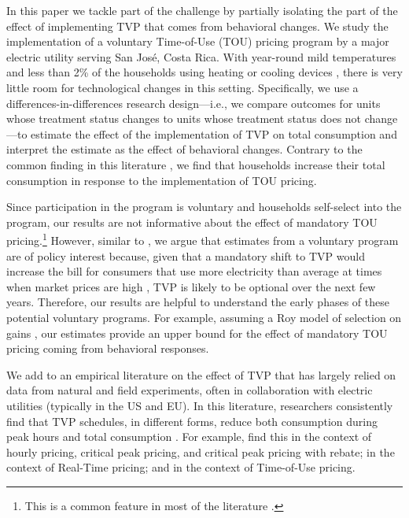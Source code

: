 \documentclass[12pt]{article}
\begin{document}
In this paper we tackle part of the challenge by partially isolating the part of the effect of implementing TVP that comes from behavioral changes. We study the implementation of a voluntary Time-of-Use (TOU) pricing program by a major electric utility serving San José, Costa Rica. With year-round mild temperatures and less than 2\% of the households using heating or cooling devices \citep{ministeriodeambienteyenergiaEstudioParaCaracterizacion2019}, there is very little room for technological changes in this setting. Specifically, we use a differences-in-differences research design---i.e., we compare outcomes for units whose treatment status changes to units whose treatment status does not change---to estimate the effect of the implementation of TVP on total consumption and interpret the estimate as the effect of behavioral changes. Contrary to the common finding in this literature \cite{faruquiHouseholdResponseDynamic2010,minabadtke-berkowPrimerTimevariantElectricity2015}, we find that households increase their total consumption in response to the implementation of TOU pricing.

Since participation in the program is voluntary and households self-select into the program, our results are not informative about the effect of mandatory TOU pricing.\footnote{This is a common feature in most of the literature \citep{faruquiHouseholdResponseDynamic2010,minabadtke-berkowPrimerTimevariantElectricity2015}.} However, similar to \citet{allcottRethinkingRealtimeElectricity2011}, we argue that estimates from a voluntary program are of policy interest because, given that a mandatory shift to TVP would increase the bill for consumers that use more electricity than average at times when market prices are high \citep{borensteinWealthTransfersLarge2007}, TVP is likely to be optional over the next few years. Therefore, our results are helpful to understand the early phases of these potential voluntary programs. For example, assuming a Roy model of selection on gains \citep{heckmanChapter70Econometric2007}, our estimates provide an upper bound for the effect of mandatory TOU pricing coming from behavioral responses.

We add to an empirical literature on the effect of TVP that has largely relied on data from natural and field experiments, often in collaboration with electric utilities (typically in the US and EU). In this literature, researchers consistently find that TVP schedules, in different forms, reduce both consumption during peak hours and total consumption \citep{faruquiHouseholdResponseDynamic2010,minabadtke-berkowPrimerTimevariantElectricity2015}. For example, \citet{wolakResidentialCustomersRespond2011} find this in the context of hourly pricing, critical peak pricing, and critical peak pricing with rebate; \citet{allcottRethinkingRealtimeElectricity2011} in the context of Real-Time pricing; and \citet{jessoeUnderstandingRolePrice2014} in the context of Time-of-Use pricing.
\end{document}

